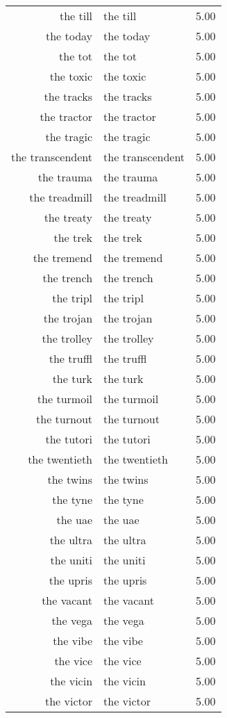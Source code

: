 \begin{table}[ht]
\begin{tabular}{rlr}
  the till & the till & 5.00 \\ 
  the today & the today & 5.00 \\ 
  the tot & the tot & 5.00 \\ 
  the toxic & the toxic & 5.00 \\ 
  the tracks & the tracks & 5.00 \\ 
  the tractor & the tractor & 5.00 \\ 
  the tragic & the tragic & 5.00 \\ 
  the transcendent & the transcendent & 5.00 \\ 
  the trauma & the trauma & 5.00 \\ 
  the treadmill & the treadmill & 5.00 \\ 
  the treaty & the treaty & 5.00 \\ 
  the trek & the trek & 5.00 \\ 
  the tremend & the tremend & 5.00 \\ 
  the trench & the trench & 5.00 \\ 
  the tripl & the tripl & 5.00 \\ 
  the trojan & the trojan & 5.00 \\ 
  the trolley & the trolley & 5.00 \\ 
  the truffl & the truffl & 5.00 \\ 
  the turk & the turk & 5.00 \\ 
  the turmoil & the turmoil & 5.00 \\ 
  the turnout & the turnout & 5.00 \\ 
  the tutori & the tutori & 5.00 \\ 
  the twentieth & the twentieth & 5.00 \\ 
  the twins & the twins & 5.00 \\ 
  the tyne & the tyne & 5.00 \\ 
  the uae & the uae & 5.00 \\ 
  the ultra & the ultra & 5.00 \\ 
  the uniti & the uniti & 5.00 \\ 
  the upris & the upris & 5.00 \\ 
  the vacant & the vacant & 5.00 \\ 
  the vega & the vega & 5.00 \\ 
  the vibe & the vibe & 5.00 \\ 
  the vice & the vice & 5.00 \\ 
  the vicin & the vicin & 5.00 \\ 
  the victor & the victor & 5.00 \\ 

\end{tabular}
\end{table}
